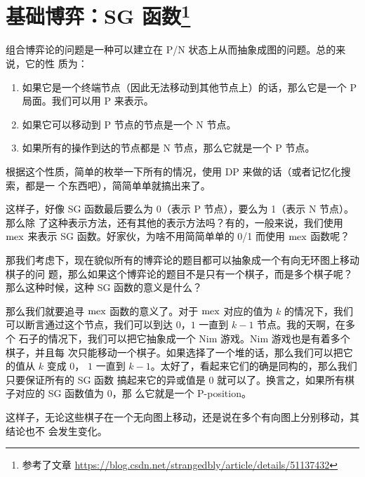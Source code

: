\section[基础博弈：SG 函数]{基础博弈：SG 函数\footnote{参考了文章
\url{https://blog.csdn.net/strangedbly/article/details/51137432}}}
组合博弈论的问题是一种可以建立在 P/N 状态上从而抽象成图的问题。总的来说，它的性
质为：
\begin{enumerate}
    \item 如果它是一个终端节点（因此无法移动到其他节点上）的话，那么它是一个 P
        局面。我们可以用 P 来表示。
    \item 如果它可以移动到 P 节点的节点是一个 N 节点。
    \item 如果所有的操作到达的节点都是 N 节点，那么它就是一个 P 节点。
\end{enumerate}

根据这个性质，简单的枚举一下所有的情况，使用 DP 来做的话（或者记忆化搜索，都是一
个东西吧），简简单单就搞出来了。

这样子，好像 SG 函数最后要么为 0（表示 P 节点），要么为 1（表示 N 节点）。那么除
了这种表示方法，还有其他的表示方法吗？有的，一般来说，我们使用 $\mathrm{mex}$ 来表示 SG
函数。好家伙，为啥不用简简单单的 0/1 而使用 $\mathrm{mex}$ 函数呢？

那我们考虑下，现在貌似所有的博弈论的题目都可以抽象成一个有向无环图上移动棋子的问
题，那么如果这个博弈论的题目不是只有一个棋子，而是多个棋子呢？那么这种时候，这种
SG 函数的意义是什么？

那么我们就要追寻 $\mathrm{mex}$ 函数的意义了。对于 $\mathrm{mex}$ 对应的值为 $k$ 的情况下，我们
可以断言通过这个节点，我们可以到达 $0$，$1$ 一直到 $k-1$ 节点。我的天啊，在多个
石子的情况下，我们可以把它抽象成一个 Nim 游戏。Nim 游戏也是有着多个棋子，并且每
次只能移动一个棋子。如果选择了一个堆的话，那么我们可以把它的值从 $k$ 变成 $0$，
$1$ 一直到 $k-1$。太好了，看起来它们的确是同构的，那么我们只要保证所有的 SG 函数
搞起来它的异或值是 $0$ 就可以了。换言之，如果所有棋子对应的 SG 函数值为 $0$，那
么它就是一个 P-position。

这样子，无论这些棋子在一个无向图上移动，还是说在多个有向图上分别移动，其结论也不
会发生变化。

